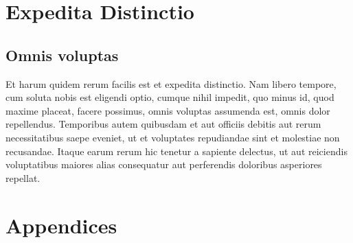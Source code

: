 \documentclass[a4paper,11pt,twoside,onecolumn,final,openright]{book}
\begin{document}
\newpage
\thispagestyle{empty}



\part{Expedita Distinctio}
\thispagestyle{empty}
\chapter*{Omnis voluptas}
\thispagestyle{empty}

Et harum quidem rerum facilis est et expedita distinctio. Nam libero tempore, cum soluta nobis est eligendi optio, cumque nihil impedit, quo minus id, quod maxime placeat, facere possimus, omnis voluptas assumenda est, omnis dolor repellendus. Temporibus autem quibusdam et aut officiis debitis aut rerum necessitatibus saepe eveniet, ut et voluptates repudiandae sint et molestiae non recusandae. Itaque earum rerum hic tenetur a sapiente delectus, ut aut reiciendis voluptatibus maiores alias consequatur aut perferendis doloribus asperiores repellat.
\newpage
\thispagestyle{empty}


%




\part{Appendices}
\appendix
\end{document}
